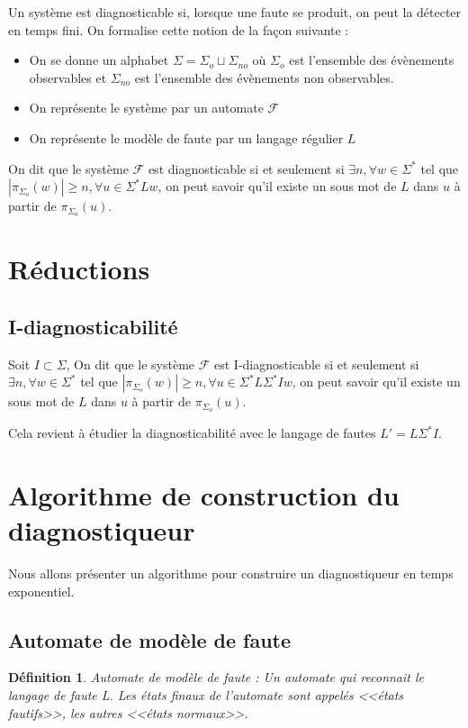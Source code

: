 \documentclass[10pt,a4paper]{article}
\newtheorem {mydef} {D\'efinition}
\begin{document}
Un syst\`eme est diagnosticable si, lorsque une faute se produit, on peut la détecter en temps fini. On formalise cette notion de la fa\c{c}on suivante :
\begin{itemize}
	\item On se donne un alphabet $\Sigma=\Sigma_o\sqcup\Sigma_{no}$ o\`u $\Sigma_o$ est l'ensemble des \'ev\`enements observables et $\Sigma_{no}$ est l'ensemble des \'ev\`enements non observables.
	\item On repr\'esente le syst\`eme par un automate $\mathcal F$
	\item On repr\'esente le mod\`ele de faute par un langage r\'egulier $L$
\end{itemize}

On dit que le système $\mathcal F$ est diagnosticable si et seulement si $\exists n, \forall w \in \Sigma^*$ tel que $|\pi_{\Sigma_o}(w)| \geq n, \forall u \in \Sigma^* L w$, on peut savoir qu'il existe un sous mot de $L$ dans $u$ à partir de $\pi_{\Sigma_o}(u)$. 


\section{R\'eductions}

\subsection{I-diagnosticabilit\'e}

Soit $I \subset \Sigma$, On dit que le système $\mathcal F$ est I-diagnosticable si et seulement si $\exists n, \forall w \in \Sigma^*$ tel que $|\pi_{\Sigma_o}(w)| \geq n, \forall u \in \Sigma^* L \Sigma^* I w$, on peut savoir qu'il existe un sous mot de $L$ dans $u$ à partir de $\pi_{\Sigma_o}(u)$. 

Cela revient à étudier la diagnosticabilité avec le langage de fautes $L'=L \Sigma^* I$.



\section{Algorithme de construction du diagnostiqueur}
    Nous allons présenter un algorithme pour construire un diagnostiqueur en temps exponentiel.
        \subsection{Automate de mod\`ele de faute}
   \begin{mydef}{Automate de mod\`ele de faute : }
 Un automate qui reconnait le langage de faute L. Les états finaux de l'automate sont appelés <<\'etats fautifs>>, les autres <<\'etats normaux>>.
 \end{mydef}
    
\end{document}
